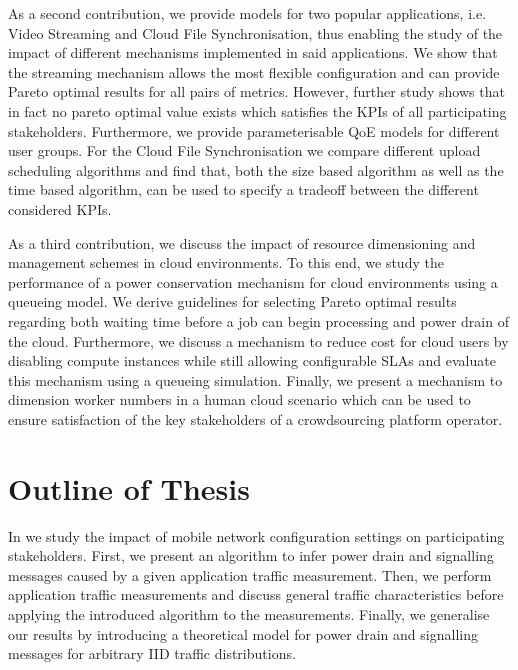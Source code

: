 As a second contribution, we provide models for two popular applications, i.e. Video Streaming and Cloud File Synchronisation, thus enabling the study of the impact of different mechanisms implemented in said applications.
We show that the streaming mechanism allows the most flexible configuration and can provide Pareto optimal results for all pairs of metrics.
However, further study shows that in fact no pareto optimal value exists which satisfies the \glspl{KPI} of all participating stakeholders.
Furthermore, we provide parameterisable \gls{QoE} models for different user groups.
For the Cloud File Synchronisation we compare different upload scheduling algorithms and find that, both the size based algorithm as well as the time based algorithm, can be used to specify a tradeoff between the different considered \glspl{KPI}.

As a third contribution, we discuss the impact of resource dimensioning and management schemes in cloud environments.
To this end, we study the performance of a power conservation mechanism for cloud environments using a queueing model.
We derive guidelines for selecting Pareto optimal results regarding both waiting time before a job can begin processing and power drain of the cloud.
Furthermore, we discuss a mechanism to reduce cost for cloud users by disabling compute instances while still allowing configurable \glspl{SLA} and evaluate this mechanism using a queueing simulation.
Finally, we present a mechanism to dimension worker numbers in a human cloud scenario which can be used to ensure satisfaction of the key stakeholders of a crowdsourcing platform operator.

\section{Outline of Thesis}\label{sec:introduction:outline}

In  we study the impact of mobile network configuration settings on participating stakeholders.
First, we present an algorithm to infer power drain and signalling messages caused by a given application traffic measurement.
Then, we perform application traffic measurements and discuss general traffic characteristics before applying the introduced algorithm to the measurements.
Finally, we generalise our results by introducing a theoretical model for power drain and signalling messages for arbitrary \gls{IID} traffic distributions.


